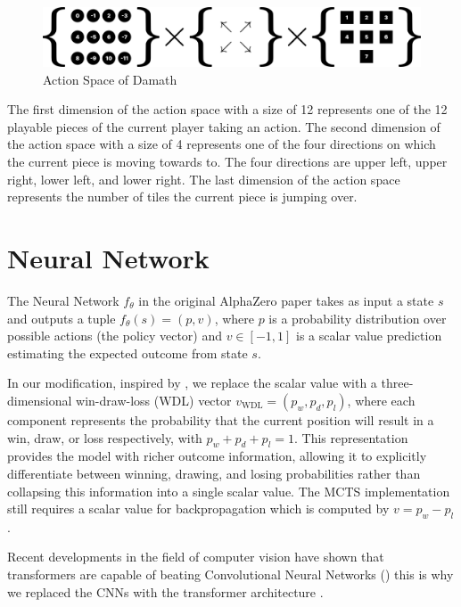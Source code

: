 \begin{figure}[htb]
    \centering
    \includegraphics[width=0.7\linewidth]{images/action_space.png}
    \caption{Action Space of Damath}
    \label{fig:action_space}
\end{figure}

The first dimension of the action space with a size of 12 represents one of the 12 playable pieces of the current player taking an action. The second dimension of the action space with a size of 4 represents one of the four directions on which the current piece is moving towards to. The four directions are upper left, upper right, lower left, and lower right. The last dimension of the action space represents the number of tiles the current piece is jumping over.

\section{Neural Network}

The Neural Network $f_{\theta}$ in the original AlphaZero paper \cite{silver2017masteringchessshogiselfplay} takes as input a state $s$ and outputs a tuple $f_{\theta}(s) = (p, v)$, where $p$ is a probability distribution over possible actions (the policy vector) and $v \in [-1, 1]$ is a scalar value prediction estimating the expected outcome from state $s$.

In our modification, inspired by \cite{czech2024representationmattersmasteringchess}, we replace the scalar value with a three-dimensional win-draw-loss (WDL) vector $v_{\text{WDL}} = (p_w, p_d, p_l)$, where each component represents the probability that the current position will result in a win, draw, or loss respectively, with $p_w + p_d + p_l = 1$. This representation provides the model with richer outcome information, allowing it to explicitly differentiate between winning, drawing, and losing probabilities rather than collapsing this information into a single scalar value. The MCTS implementation still requires a scalar value for backpropagation which is computed by $v = p_w - p_l$.

Recent developments in the field of computer vision have shown that transformers are capable of beating Convolutional Neural Networks (\cite{dosovitskiy2021imageworth16x16words}) this is why we replaced the CNNs with the transformer architecture \cite{vaswani2023attentionneed}.


